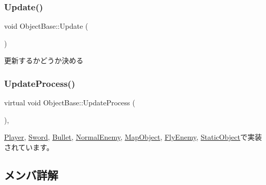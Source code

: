 \mbox{\label{class_object_base_a5b5672034139b22235ada326eb16dd3e}} 
\subsubsection{\texorpdfstring{Update()}{Update()}}
{\footnotesize\ttfamily void Object\+Base\+::\+Update (\begin{DoxyParamCaption}{ }\end{DoxyParamCaption})}



更新するかどうか決める 

\mbox{\label{class_object_base_a8b5b72b363a419767efde0b0e692ea95}} 
\subsubsection{\texorpdfstring{Update\+Process()}{UpdateProcess()}}
{\footnotesize\ttfamily virtual void Object\+Base\+::\+Update\+Process (\begin{DoxyParamCaption}{ }\end{DoxyParamCaption})\hspace{0.3cm}{\ttfamily [protected]}, {}}



\mbox{\hyperlink{class_player_ab8accc9b83b030f5313f1b4872a7e634}{Player}}, \mbox{\hyperlink{class_sword_a3e0221aa5c05ecada9def39fb38c0059}{Sword}}, \mbox{\hyperlink{class_bullet_aa0867038c9c35e30ee09e21ecdccf281}{Bullet}}, \mbox{\hyperlink{class_normal_enemy_a371a6bef4feaeb0b47e1ab61dead7b77}{Normal\+Enemy}}, \mbox{\hyperlink{class_map_object_ab6b8849f15175417eca94b2703945e4b}{Map\+Object}}, \mbox{\hyperlink{class_fly_enemy_a5122c8fea26ebbd0390acfd6e41931ff}{Fly\+Enemy}}, \mbox{\hyperlink{class_static_object_a7fa678c3c4032bb6e9417f93a8bb895c}{Static\+Object}}で実装されています。



\subsection{メンバ詳解}
\mbox{\label{class_object_base_ade1c868f20653a6fa5236544120eca2b}} 
